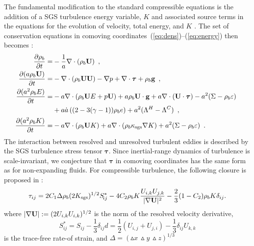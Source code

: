 The fundamental modification to the standard compressible equations is the addition
of a SGS turbulence energy variable, $K$ and associated source terms in the equations
for the evolution of velocity, total energy, and $K$ \cite{schumann:1975,sagaut,schmidt:2006}.
The set of conservation equations in comoving coordinates~(\ref{eq:dens})--(\ref{eq:energy}) then becomes
\cite{maier:2009}:
\begin{align}
\frac{\partial \rho_b}{\partial t} =& - \frac{1}{a} \nabla \cdot (\rho_b {\bf U}) \enskip , \\
\label{eq:momt_les}
\frac{\partial (a \rho_b {\bf U})}{\partial t} =& 
-             \nabla \cdot (\rho_b {\bf U} {\bf U}) 
-             \nabla p
+             \nabla \cdot \boldsymbol{\tau}
+             \rho_b {\bf g}  \enskip , \\
\label{eq:energy_les}
\frac{\partial (a^2 \rho_b E)}{\partial t} =& - a \nabla \cdot (\rho_b {\bf U} E + p {\bf U})
+  a \rho_b {\bf U} \cdot {\bf g} 
+ a \nabla \cdot ({\bf U}\cdot\boldsymbol{\tau}) - a^2(\Sigma - \rho_b \varepsilon) \enskip \\
\nonumber
&+ a \dot{a} \left( ( 2 - 3 (\gamma - 1) ) \rho_b e \right) 
+ a^2 ( \Lambda^H  - \Lambda^C )  \enskip , \\
\label{eq:k_les}
\frac{\partial (a^2\rho_b K)}{\partial t} =&
- a\nabla \cdot \left(\rho_b {\bf U} K\right) 
+ a\nabla \cdot \left(\rho_b \kappa_{\rm sgs}\nabla K\right)  
+ a^2(\Sigma - \rho_b \varepsilon)\enskip .
\end{align}
The interaction between resolved and unresolved turbulent eddies is described by
the SGS turbulence stress tensor $\boldsymbol{\tau}$. Since inertial-range dynamics of 
turbulence is scale-invariant, we conjecture that $\boldsymbol{\tau}$ in comoving coordinates 
has the same form as for non-expanding fluids. For compressible turbulence, 
the following closure is proposed in \cite{schmidt:2011}:
\begin{equation}
 \label{eq:tau_nonlin}
  \tau_{ij}= 2C_{1}\Delta\rho_b(2 K_{\mathrm{sgs}})^{1/2}S_{\! ij}^{\ast}
  -4C_{2}\rho_bK\frac{U_{i,k}U_{j,k}}{|\nabla{\bf U}|^{2}}
  -\frac{2}{3}(1-C_{2})\rho_bK\delta_{ij}.
\end{equation}
where $|\nabla{\bf U}|:=(2U_{i,k}U_{i,k})^{1/2}$ is the norm of the resolved velocity derivative,
\begin{equation}
S_{ij}^{\ast} = S_{ij} - \frac{1}{3}\delta_{ij}d =
\frac{1}{2} (U_{i,j} + U_{j,i}) - \frac{1}{3}\delta_{ij}U_{k,k}
\end{equation}
is the trace-free rate-of strain, and $\Delta=(\vartriangle\!x\,\vartriangle\!y\,\vartriangle\!z)^{1/3}$
